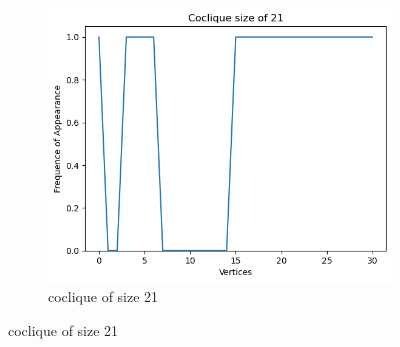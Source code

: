 \documentclass{amsart}
\theoremstyle{definition}
\begin{document}
\begin{appendix}
\begin{figure}[hbt!]
\begin{subfigure}[b]{.45\textwidth}
		\includegraphics[width=1\linewidth]{depth_5_size_21.png}
		\caption{coclique of size 21}
	\end{subfigure}
\end{figure}


\end{appendix}
\end{document}
